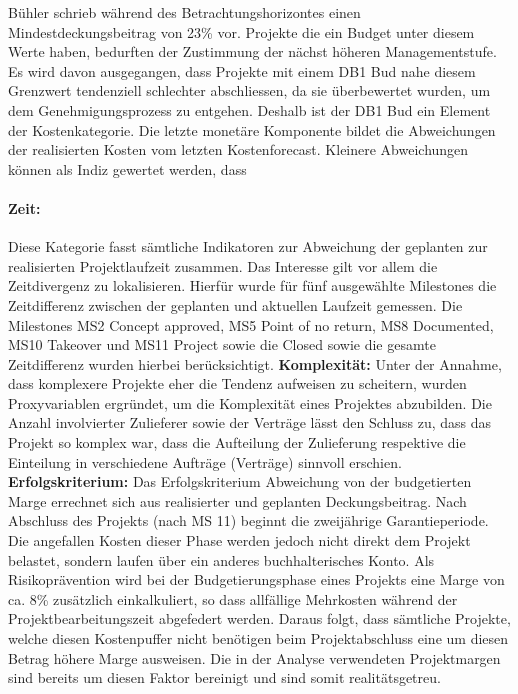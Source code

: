 \newline Bühler schrieb während des Betrachtungshorizontes einen Mindestdeckungsbeitrag von 23\% vor. Projekte die ein Budget unter diesem Werte haben, bedurften der Zustimmung der nächst höheren Managementstufe. Es wird davon ausgegangen, dass Projekte mit einem DB1 Bud nahe diesem Grenzwert tendenziell schlechter abschliessen, da sie überbewertet wurden, um dem Genehmigungsprozess zu entgehen. Deshalb ist der DB1 Bud ein Element der Kostenkategorie.
\newline Die letzte monetäre Komponente bildet die Abweichungen der realisierten Kosten vom letzten Kostenforecast. Kleinere Abweichungen können als Indiz gewertet werden, dass 
\paragraph{Zeit: } Diese Kategorie fasst sämtliche Indikatoren zur Abweichung der geplanten zur realisierten Projektlaufzeit zusammen. Das Interesse gilt vor allem die Zeitdivergenz zu lokalisieren. Hierfür wurde für fünf ausgewählte Milestones die Zeitdifferenz zwischen der geplanten und aktuellen Laufzeit gemessen. Die Milestones MS2 Concept approved, MS5 Point of no return, MS8 Documented, MS10 Takeover und MS11 Project sowie die  Closed sowie die gesamte Zeitdifferenz wurden hierbei berücksichtigt. 	\newline\newline\textbf{Komplexität:} Unter der Annahme, dass komplexere Projekte eher die Tendenz aufweisen zu scheitern, wurden Proxyvariablen ergründet, um die Komplexität eines Projektes abzubilden. Die Anzahl involvierter Zulieferer sowie der Verträge lässt den Schluss zu, dass das Projekt so komplex war, dass die Aufteilung der Zulieferung respektive die Einteilung in verschiedene Aufträge (Verträge) sinnvoll erschien.
\newline\newline\textbf{Erfolgskriterium:} Das Erfolgskriterium Abweichung von der budgetierten Marge errechnet sich aus realisierter und geplanten Deckungsbeitrag. Nach Abschluss des Projekts (nach MS 11) beginnt die zweijährige Garantieperiode. Die angefallen Kosten dieser Phase werden jedoch nicht direkt dem Projekt belastet, sondern laufen über ein anderes buchhalterisches Konto. Als Risikoprävention wird bei der Budgetierungsphase eines Projekts eine Marge von ca. 8\% zusätzlich einkalkuliert, so dass allfällige Mehrkosten während der Projektbearbeitungszeit abgefedert werden. Daraus folgt, dass sämtliche Projekte, welche diesen Kostenpuffer nicht benötigen beim Projektabschluss eine um diesen Betrag höhere Marge ausweisen. Die in der Analyse verwendeten Projektmargen sind bereits um diesen Faktor bereinigt und sind somit realitätsgetreu.


